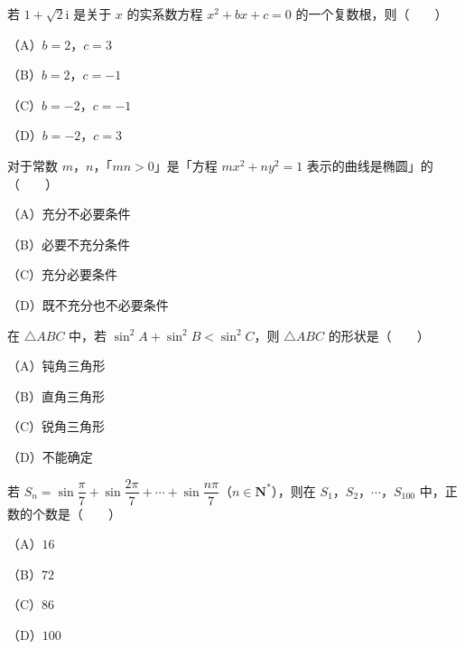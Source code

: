 \begin{question}
若 $1+\sqrt2\mathrm i$ 是关于 $x$ 的实系数方程 $x^2+bx+c=0$ 的一个复数根，则\mbox{（　　）}

（A）$b=2$，$c=3$

（B）$b=2$，$c=-1$

（C）$b=-2$，$c=-1$

（D）$b=-2$，$c=3$

\end{question}
\begin{question}
对于常数 $m$，$n$，「$mn>0$」是「方程 $mx^2+ny^2=1$ 表示的曲线是椭圆」的\mbox{（　　）}

（A）充分不必要条件

（B）必要不充分条件

（C）充分必要条件

（D）既不充分也不必要条件

\end{question}
\begin{question}
在 $\triangle ABC$ 中，若 $\sin^2A+\sin^2B<\sin^2C$，则 $\triangle ABC$ 的形状是\mbox{（　　）}

（A）钝角三角形

（B）直角三角形

（C）锐角三角形

（D）不能确定

\end{question}
\begin{question}
若 $S_n=\sin\dfrac\pi7+\sin\dfrac{2\pi}7+\cdots+\sin\dfrac{n\pi}7$（$n\in\mathbf N^*$），则在 $S_1$，$S_2$，$\cdots$，$S_{100}$ 中，正数的个数是\mbox{（　　）}

（A）$16$

（B）$72$

（C）$86$

（D）$100$

\end{question}

